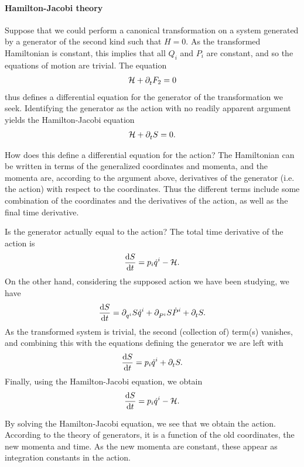 \paragraph{Hamilton-Jacobi theory}
Suppose that we could perform a canonical transformation on a system generated by a generator of the second kind such that $H = 0$. As the transformed Hamiltonian is constant, this implies that all $Q_{i}$ and $P_{i}$ are constant, and so the equations of motion are trivial. The equation
\begin{align*}
	\mathcal{H} + \partial^{}_{t}F_{2} = 0
\end{align*}
thus defines a differential equation for the generator of the transformation we seek. Identifying the generator as the action with no readily apparent argument yields the Hamilton-Jacobi equation
\begin{align*}
	\mathcal{H} + \partial^{}_{t}S = 0.
\end{align*}

How does this define a differential equation for the action? The Hamiltonian can be written in terms of the generalized coordinates and momenta, and the momenta are, according to the argument above, derivatives of the generator (i.e. the action) with respect to the coordinates. Thus the different terms include some combination of the coordinates and the derivatives of the action, as well as the final time derivative.

Is the generator actually equal to the action? The total time derivative of the action is
\begin{align*}
	\dv{S}{t} = p_{i}\dot{q}^{i} - \mathcal{H}.
\end{align*}
On the other hand, considering the supposed action we have been studying, we have
\begin{align*}
	\dv{S}{t} = \partial^{}_{q^{i}}S\dot{q}^{i} + \partial^{}_{P^{i}}S\dot{P}^{i} + \partial^{}_{t}S.
\end{align*}
As the transformed system is trivial, the second (collection of) term(s) vanishes, and combining this with the equations defining the generator we are left with
\begin{align*}
	\dv{S}{t} = p_{i}\dot{q}^{i} + \partial^{}_{t}S.
\end{align*}
Finally, using the Hamilton-Jacobi equation, we obtain
\begin{align*}
	\dv{S}{t} = p_{i}\dot{q}^{i} - \mathcal{H}.
\end{align*}

By solving the Hamilton-Jacobi equation, we see that we obtain the action. According to the theory of generators, it is a function of the old coordinates, the new momenta and time. As the new momenta are constant, these appear as integration constants in the action.

